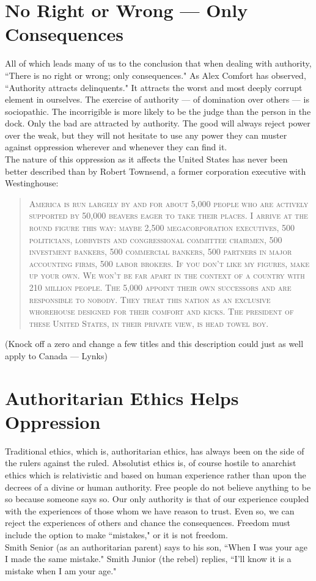 \section*{No Right or Wrong --- Only Consequences}
All of which leads many of us to the conclusion that when dealing with authority, ``There is no right or wrong; only consequences." As Alex Comfort has observed, ``Authority attracts delinquents." It attracts the worst and most deeply corrupt element in ourselves. The exercise of authority --- of domination over others --- is sociopathic. The incorrigible is more likely to be the judge than the person in the dock. Only the bad are attracted by authority. The good will always reject power over the weak, but they will not hesitate to use any power they can muster against oppression wherever and whenever they can find it.\\
The nature of this oppression as it affects the United States has never been better described than by Robert Townsend, a former corporation executive with Westinghouse:
\blockquote{\textsc{America is run largely by and for about 5,000 people who are actively supported by 50,000 beavers eager to take their places. I arrive at the round figure this way: maybe 2,500 megacorporation executives, 500 politicians, lobbyists and congressional committee chairmen, 500 investment bankers, 500 commercial bankers, 500 partners in major accounting firms, 500 labor brokers. If you don't like my figures, make up your own. We won't be far apart in the context of a country with 210 million people. The 5,000 appoint their own successors and are responsible to nobody. They treat this nation as an exclusive whorehouse designed for their comfort and kicks. The president of these United States, in their private view, is head towel boy.}}
(Knock off a zero and change a few titles and this description could just as well apply to Canada --- Lynks)

\section*{Authoritarian Ethics Helps Oppression}
Traditional ethics, which is, authoritarian ethics, has always been on the side of the rulers against the ruled. Absolutist ethics is, of course hostile to anarchist ethics which is relativistic and based on human experience rather than upon the decrees of a divine or human authority. Free people do not believe anything to be so because someone says so. Our only authority is that of our experience coupled with the experiences of those whom we have reason to trust. Even so, we can reject the experiences of others and chance the consequences. Freedom must include the option to make ``mistakes," or it is not freedom.\\
Smith Senior (as an authoritarian parent) says to his son, ``When I was your age I made the same mistake." Smith Junior (the rebel) replies, ``I'll know it is a mistake when I am your age."

